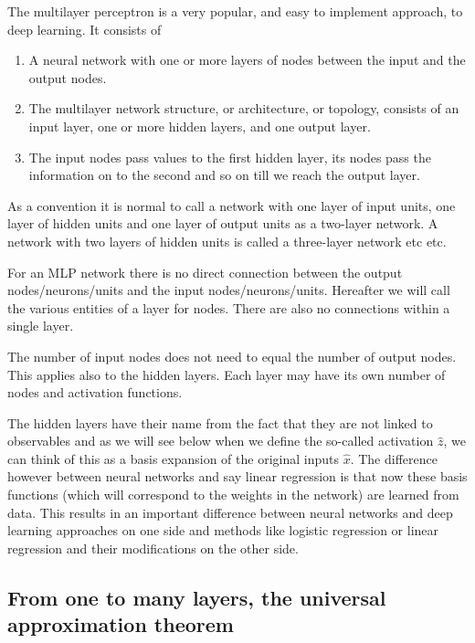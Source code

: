 \documentclass[%
oneside,                 %
final,                   %
10pt]{article}
\begin{document}
The multilayer perceptron is a very popular, and easy to implement approach, to deep learning. It consists of
\begin{enumerate}
\item A neural network with one or more layers of nodes between the input and the output nodes.

\item The multilayer network structure, or architecture, or topology, consists of an input layer, one or more hidden layers, and one output layer.

\item The input nodes pass values to the first hidden layer, its nodes pass the information on to the second and so on till we reach the output layer.
\end{enumerate}

\noindent
As a convention it is normal to call  a  network with one layer of input units, one layer of hidden
units and one layer of output units as  a two-layer network. A network with two layers of hidden units is called a three-layer network etc etc.

For an MLP network there is no direct connection between the output nodes/neurons/units and  the input nodes/neurons/units.
Hereafter we will call the various entities of a layer for nodes.
There are also no connections within a single layer.

The number of input nodes does not need to equal the number of output
nodes. This applies also to the hidden layers. Each layer may have its
own number of nodes and activation functions.

The hidden layers have their name from the fact that they are not
linked to observables and as we will see below when we define the
so-called activation $\hat{z}$, we can think of this as a basis
expansion of the original inputs $\hat{x}$. The difference however
between neural networks and say linear regression is that now these
basis functions (which will correspond to the weights in the network)
are learned from data. This results in  an important difference between
neural networks and deep learning approaches on one side and methods
like logistic regression or linear regression and their modifications on the other side.


\subsection*{From one to many layers, the universal approximation theorem}
\end{document}
